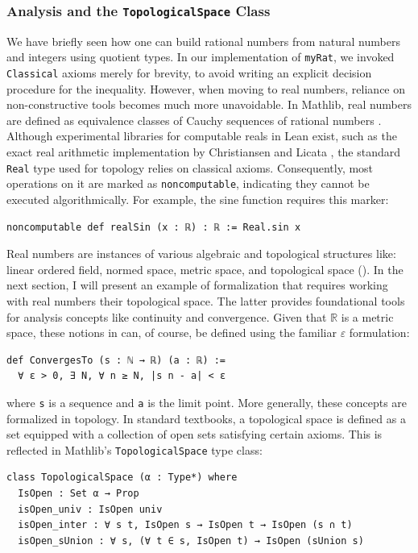 
\subsubsection{Analysis and the \lstinline[language=lean]|TopologicalSpace| Class}

We have briefly seen how one can build rational numbers from
natural numbers and integers using quotient types.
In our implementation of \lstinline[language=lean]|myRat|, we
invoked \lstinline[language=lean]|Classical| axioms merely for brevity,
to avoid writing an explicit decision procedure for the inequality.
However, when moving to real numbers, reliance on non-constructive tools
becomes much more unavoidable.
In Mathlib, real numbers are defined as equivalence classes of
Cauchy sequences of rational numbers \cite{mathlibdoc}.
Although experimental libraries for computable reals in Lean exist, such as the
exact real arithmetic implementation by Christiansen and Licata \cite{christiansen2022computing},
the standard \lstinline[language=lean]|Real| type used for topology relies
on classical axioms. Consequently, most operations on it are marked as
\lstinline[language=lean]|noncomputable|, indicating they cannot
be executed algorithmically.
For example, the sine function requires this marker:
\begin{lstlisting}[language=lean]
noncomputable def realSin (x : ℝ) : ℝ := Real.sin x
\end{lstlisting}
Real numbers are instances of
various algebraic and topological
structures like: linear ordered field, normed space, metric space, and
topological space (\cite{mathlib2020}).
In the next section, I will present an example of formalization that requires
working with real numbers their topological space.
The latter provides
foundational tools for analysis concepts like continuity and convergence.
Given that $\mathbb{R}$ is a metric space, these notions in can,
of course, be defined
using the familiar $\varepsilon$
formulation:
\begin{lstlisting}[language=lean]
def ConvergesTo (s : ℕ → ℝ) (a : ℝ) :=
  ∀ ε > 0, ∃ N, ∀ n ≥ N, |s n - a| < ε
\end{lstlisting}
where \lstinline[language=lean]|s| is a sequence
and \lstinline[language=lean]|a| is the limit point.
More generally, these concepts are formalized in topology.
In standard textbooks, a topological space
is defined as a set equipped with a collection of open sets
satisfying certain axioms. This is reflected in
Mathlib's \lstinline[language=lean]|TopologicalSpace| type class:
\begin{lstlisting}[language=lean]
class TopologicalSpace (α : Type*) where
  IsOpen : Set α → Prop
  isOpen_univ : IsOpen univ
  isOpen_inter : ∀ s t, IsOpen s → IsOpen t → IsOpen (s ∩ t)
  isOpen_sUnion : ∀ s, (∀ t ∈ s, IsOpen t) → IsOpen (sUnion s)
\end{lstlisting}

